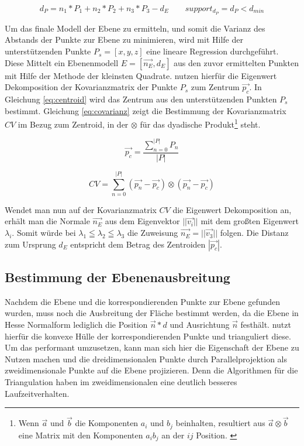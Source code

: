 \begin{equation} \label{eq:plane-distance}
d_P = n_1*P_1+n_2*P_2+n_3*P_3-d_E \qquad support_{d_P} = d_P < d_{min}
\end{equation}

Um das finale Modell der Ebene zu ermitteln, und somit die Varianz des Abstands der Punkte zur Ebene zu minimieren, wird mit Hilfe der unterstützenden Punkte \(P_{s}=\left[x,y,z\right]\) eine lineare Regression durchgeführt. Diese Mittelt ein Ebenenmodell \(E=\left[\vec{n_E}, d_E\right]\) aus den zuvor ermittelten Punkten mit Hilfe der Methode der kleinsten Quadrate. \citet{hoppe1992surface} nutzen hierfür die Eigenwert Dekomposition der Kovarianzmatrix der Punkte \(P_{s}\) zum Zentrum \(\vec{p_{c}}\). In Gleichung \ref{eq:centroid} wird das Zentrum aus den unterstützenden Punkten \(P_{s}\) bestimmt. Gleichung \ref{eq:covarianz} zeigt die Bestimmung der Kovarianzmatrix \(CV\) im Bezug zum Zentroid, in der \(\otimes\) für das dyadische Produkt\footnote{Wenn \(\vec{a}\) und \(\vec{b}\) die Komponenten \(a_i\) und \(b_j\) beinhalten, resultiert aus \(\vec{a} \otimes \vec{b}\) eine Matrix mit den Komponenten \(a_ib_j\) an der \(ij\) Position. \citep{hoppe1992surface}} steht.

\begin{equation} \label{eq:centroid}
\vec{p_{c}} = \frac{\sum_{n=0}^{|P|} P_{n}}{|P|}
\end{equation}

\begin{equation} \label{eq:covarianz}
CV = \sum_{n=0}^{|P|} ( \vec{p_{n}}- \vec{p_{c}}) \otimes ( \vec{p_{n}}- \vec{p_{c}})
\end{equation}

Wendet man nun auf der Kovarianzmatrix \(CV\) die Eigenwert Dekomposition an, erhält man die Normale \(\vec{n_E}\) aus dem Eigenvektor \(||\vec{v_i}||\) mit dem großten Eigenwert \(\lambda_i\). Somit würde bei \(\lambda_1 \leqq \lambda_2 \leqq \lambda_3\) die Zuweisung \(\vec{n_E} = ||\vec{v_3}||\) folgen. Die Distanz zum Ursprung \(d_E\) entspricht dem Betrag des Zentroiden \(|\vec{p_c}|\). \citep{hoppe1992surface}

\subsection{Bestimmung der Ebenenausbreitung}

Nachdem die Ebene und die korrespondierenden Punkte zur Ebene gefunden wurden, muss noch die Ausbreitung der Fläche bestimmt werden, da die Ebene in Hesse Normalform lediglich die Position \(\vec{n} * d\) und Ausrichtung \(\vec{n}\) festhält. \citet{PlanarSurfaceMapping} nutzt hierfür die konvexe Hülle der korrespondierenden Punkte und trianguliert diese. Um das performant umzusetzen, kann man sich hier die Eigenschaft der Ebene zu Nutzen machen und die dreidimensionalen Punkte durch Parallelprojektion als zweidimensionale Punkte auf die Ebene projizieren. Denn die Algorithmen für die Triangulation haben im zweidimensionalen eine deutlich besseres Laufzeitverhalten. \\

